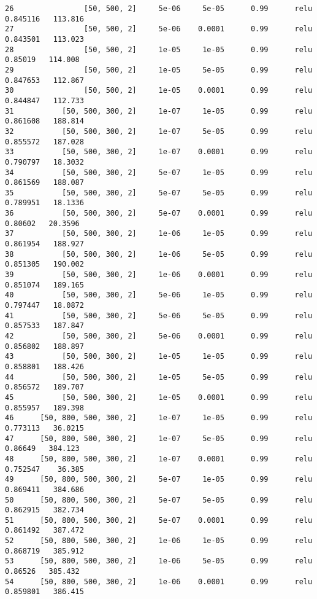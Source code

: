 \documentclass[letter,doc,notimes]{article}
\begin{document}
\begin{verbatim}
26                [50, 500, 2]     5e-06     5e-05      0.99      relu  0.845116   113.816
27                [50, 500, 2]     5e-06    0.0001      0.99      relu  0.843501   113.023
28                [50, 500, 2]     1e-05     1e-05      0.99      relu   0.85019   114.008
29                [50, 500, 2]     1e-05     5e-05      0.99      relu  0.847653   112.867
30                [50, 500, 2]     1e-05    0.0001      0.99      relu  0.844847   112.733
31           [50, 500, 300, 2]     1e-07     1e-05      0.99      relu  0.861608   188.814
32           [50, 500, 300, 2]     1e-07     5e-05      0.99      relu  0.855572   187.028
33           [50, 500, 300, 2]     1e-07    0.0001      0.99      relu  0.790797   18.3032
34           [50, 500, 300, 2]     5e-07     1e-05      0.99      relu  0.861569   188.087
35           [50, 500, 300, 2]     5e-07     5e-05      0.99      relu  0.789951   18.1336
36           [50, 500, 300, 2]     5e-07    0.0001      0.99      relu   0.80602   20.3596
37           [50, 500, 300, 2]     1e-06     1e-05      0.99      relu  0.861954   188.927
38           [50, 500, 300, 2]     1e-06     5e-05      0.99      relu  0.851305   190.002
39           [50, 500, 300, 2]     1e-06    0.0001      0.99      relu  0.851074   189.165
40           [50, 500, 300, 2]     5e-06     1e-05      0.99      relu  0.797447   18.0872
41           [50, 500, 300, 2]     5e-06     5e-05      0.99      relu  0.857533   187.847
42           [50, 500, 300, 2]     5e-06    0.0001      0.99      relu  0.856802   188.897
43           [50, 500, 300, 2]     1e-05     1e-05      0.99      relu  0.858801   188.426
44           [50, 500, 300, 2]     1e-05     5e-05      0.99      relu  0.856572   189.707
45           [50, 500, 300, 2]     1e-05    0.0001      0.99      relu  0.855957   189.398
46      [50, 800, 500, 300, 2]     1e-07     1e-05      0.99      relu  0.773113   36.0215
47      [50, 800, 500, 300, 2]     1e-07     5e-05      0.99      relu   0.86649   384.123
48      [50, 800, 500, 300, 2]     1e-07    0.0001      0.99      relu  0.752547    36.385
49      [50, 800, 500, 300, 2]     5e-07     1e-05      0.99      relu  0.869411   384.686
50      [50, 800, 500, 300, 2]     5e-07     5e-05      0.99      relu  0.862915   382.734
51      [50, 800, 500, 300, 2]     5e-07    0.0001      0.99      relu  0.861492   387.472
52      [50, 800, 500, 300, 2]     1e-06     1e-05      0.99      relu  0.868719   385.912
53      [50, 800, 500, 300, 2]     1e-06     5e-05      0.99      relu   0.86526   385.432
54      [50, 800, 500, 300, 2]     1e-06    0.0001      0.99      relu  0.859801   386.415

\end{verbatim}
\end{document}
